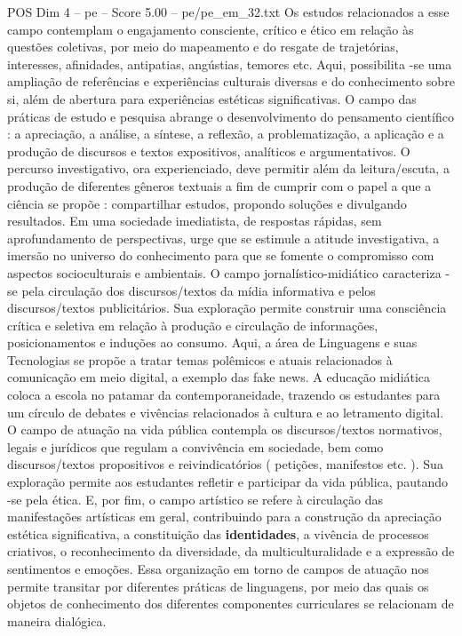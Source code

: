 \begin{textsample}{POS Dim 4 – pe – Score 5.00 – pe/pe\_em\_32.txt}
Os estudos relacionados a esse campo contemplam o engajamento consciente, crítico e ético em relação às questões coletivas, por meio do mapeamento e do resgate de trajetórias, interesses, afinidades, antipatias, angústias, temores etc.
Aqui, possibilita -se uma ampliação de referências e experiências culturais diversas e do conhecimento sobre si, além de abertura para experiências estéticas significativas.
O campo das práticas de estudo e pesquisa abrange o desenvolvimento do pensamento científico : a apreciação, a análise, a síntese, a reflexão, a problematização, a aplicação e a produção de discursos e textos expositivos, analíticos e argumentativos.
O percurso investigativo, ora experienciado, deve permitir além da leitura/escuta, a produção de diferentes gêneros textuais a fim de cumprir com o papel a que a ciência se propõe : compartilhar estudos, propondo soluções e divulgando resultados.
Em uma sociedade imediatista, de respostas rápidas, sem aprofundamento de perspectivas, urge que se estimule a atitude investigativa, a imersão no universo do conhecimento para que se fomente o compromisso com aspectos socioculturais e ambientais.
O campo jornalístico-midiático caracteriza -se pela circulação dos discursos/textos da mídia informativa e pelos discursos/textos publicitários.
Sua exploração permite construir uma consciência crítica e seletiva em relação à produção e circulação de informações, posicionamentos e induções ao consumo.
Aqui, a área de Linguagens e suas Tecnologias se propõe a tratar temas polêmicos e atuais relacionados à comunicação em meio digital, a exemplo das fake news.
A educação midiática coloca a escola no patamar da contemporaneidade, trazendo os estudantes para um círculo de debates e vivências relacionados à cultura e ao letramento digital.
O campo de atuação na vida pública contempla os discursos/textos normativos, legais e jurídicos que regulam a convivência em sociedade, bem como discursos/textos propositivos e reivindicatórios ( petições, manifestos etc. ).
Sua exploração permite aos estudantes refletir e participar da vida pública, pautando -se pela ética.
E, por fim, o campo artístico se refere à circulação das manifestações artísticas em geral, contribuindo para a construção da apreciação estética significativa, a constituição das \textbf{identidades}, a vivência de processos criativos, o reconhecimento da diversidade, da multiculturalidade e a expressão de sentimentos e emoções.
Essa organização em torno de campos de atuação nos permite transitar por diferentes práticas de linguagens, por meio das quais os objetos de conhecimento dos diferentes componentes curriculares se relacionam de maneira dialógica.

\end{textsample}
